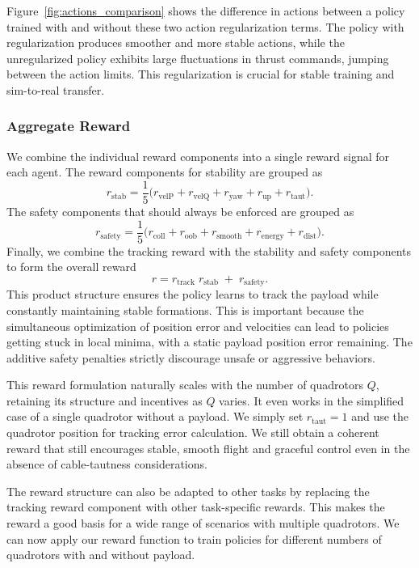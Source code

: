 Figure~\ref{fig:actions_comparison} shows the difference in actions between a policy trained with and without these two action regularization terms. The policy with regularization produces smoother and more stable actions, while the unregularized policy exhibits large fluctuations in thrust commands, jumping between the action limits. This regularization is crucial for stable training and sim-to-real transfer.

\subsubsection{Aggregate Reward}
We combine the individual reward components into a single reward signal for each agent. The reward components for stability are grouped as
\begin{equation}
r_{\mathrm{stab}}
= \frac{1}{5}\bigl(r_{\mathrm{velP}} + r_{\mathrm{velQ}} + r_{\mathrm{yaw}} + r_{\mathrm{up}} + r_{\mathrm{taut}}\bigr).
\end{equation}
The safety components that should always be enforced are grouped as
\begin{equation}
r_{\mathrm{safety}}
= \frac{1}{5}\bigl(r_{\mathrm{coll}} + r_{\mathrm{oob}} + r_{\mathrm{smooth}} + r_{\mathrm{energy}} + r_{\mathrm{dist}}\bigr).
\end{equation}
Finally, we combine the tracking reward with the stability and safety components to form the overall reward
\begin{equation}
r
= r_{\mathrm{track}}\;r_{\mathrm{stab}}
\;+\;r_{\mathrm{safety}}.
\end{equation}
This product structure ensures the policy learns to track the payload while constantly maintaining stable formations. This is important because the simultaneous optimization of position error and velocities can lead to policies getting stuck in local minima, with a static payload position error remaining.
The additive safety penalties strictly discourage unsafe or aggressive behaviors.

This reward formulation naturally scales with the number of quadrotors \(Q\), retaining its structure and incentives as \(Q\) varies. It even works in the simplified case of a single quadrotor without a payload. We simply set \(r_{\mathrm{taut}}=1\) and use the quadrotor position for tracking error calculation. We still obtain a coherent reward that still encourages stable, smooth flight and graceful control even in the absence of cable-tautness considerations.

The reward structure can also be adapted to other tasks by replacing the tracking reward component with other task-specific rewards. This makes the reward a good basis for a wide range of scenarios with multiple quadrotors. We can now apply our reward function to train policies for different numbers of quadrotors with and without payload.

